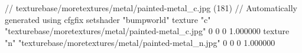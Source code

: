// texturebase/moretextures/metal/painted-metal_c.jpg (181)
// Automatically generated using cfgfix
setshader "bumpworld"
texture "c" "texturebase/moretextures/metal/painted-metal_c.jpg" 0 0 0 1.000000
texture "n" "texturebase/moretextures/metal/painted-metal_n.jpg" 0 0 0 1.000000
